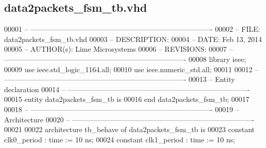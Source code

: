 \subsection{data2packets\+\_\+fsm\+\_\+tb.\+vhd}
\label{data2packets__fsm__tb_8vhd_source}

\begin{DoxyCode}
00001 \textcolor{keyword}{-- ---------------------------------------------------------------------------- }
00002 \textcolor{keyword}{-- FILE:    data2packets\_fsm\_tb.vhd}
00003 \textcolor{keyword}{-- DESCRIPTION: }
00004 \textcolor{keyword}{-- DATE:    Feb 13, 2014}
00005 \textcolor{keyword}{-- AUTHOR(s):   Lime Microsystems}
00006 \textcolor{keyword}{-- REVISIONS:}
00007 \textcolor{keyword}{-- ---------------------------------------------------------------------------- }
00008 \textcolor{vhdlkeyword}{library }\textcolor{keywordflow}{ieee};
00009 \textcolor{vhdlkeyword}{use }ieee.std\_logic\_1164.\textcolor{keywordflow}{all};
00010 \textcolor{vhdlkeyword}{use }ieee.numeric\_std.\textcolor{keywordflow}{all};
00011 
00012 \textcolor{keyword}{-- ----------------------------------------------------------------------------}
00013 \textcolor{keyword}{-- Entity declaration}
00014 \textcolor{keyword}{-- ----------------------------------------------------------------------------}
00015 \textcolor{keywordflow}{entity }data2packets_fsm_tb \textcolor{keywordflow}{is}
00016 \textcolor{keywordflow}{end} \textcolor{vhdlchar}{data2packets\_fsm\_tb};
00017 
00018 \textcolor{keyword}{-- ----------------------------------------------------------------------------}
00019 \textcolor{keyword}{-- Architecture}
00020 \textcolor{keyword}{-- ----------------------------------------------------------------------------}
00021 
00022 \textcolor{keywordflow}{architecture} tb\_behave \textcolor{keywordflow}{of} data2packets_fsm_tb is
00023 \textcolor{keywordflow}{constant} \textcolor{vhdlchar}{clk0_period}          \textcolor{vhdlchar}{:} \textcolor{comment}{time} \textcolor{vhdlchar}{:=} \textcolor{vhdllogic}{}\textcolor{vhdllogic}{10} \textcolor{vhdlchar}{ns};
00024 \textcolor{keywordflow}{constant} \textcolor{vhdlchar}{clk1_period}          \textcolor{vhdlchar}{:} \textcolor{comment}{time} \textcolor{vhdlchar}{:=} \textcolor{vhdllogic}{}\textcolor{vhdllogic}{10} \textcolor{vhdlchar}{ns}; 

\end{DoxyCode}
